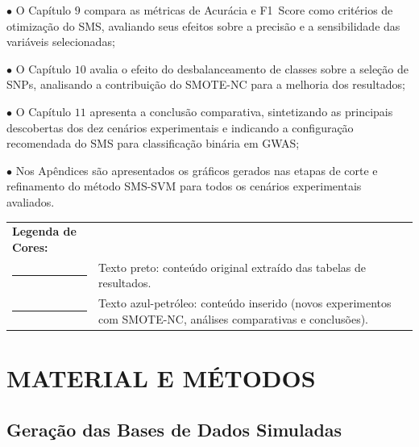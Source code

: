 \documentclass[
    12pt,
    a4paper,
    oneside,
    english,
    french,
    spanish,
    brazil
    ]{abntex2}
\newcommand{\novo}[1]{\textcolor{corNova}{#1}}
\begin{document}
$\bullet$ O Capítulo $9$ compara as métricas de Acurácia e F1~Score como critérios de otimização do SMS, avaliando seus efeitos sobre a precisão e a sensibilidade das variáveis selecionadas;

$\bullet$ O Capítulo $10$ avalia o efeito do desbalanceamento de classes sobre a seleção de SNPs, analisando a contribuição do SMOTE-NC para a melhoria dos resultados;

$\bullet$ O Capítulo $11$ apresenta a conclusão comparativa, sintetizando as principais descobertas dos dez cenários experimentais e indicando a configuração recomendada do SMS para classificação binária em GWAS;

$\bullet$ Nos Apêndices são apresentados os gráficos gerados nas etapas de corte e refinamento do método SMS-SVM para todos os cenários experimentais avaliados.

\begin{center}
\footnotesize
\begin{tabular}{@{}lp{12cm}@{}}
  \textbf{Legenda de Cores:} & \\[2pt]
  \textcolor{black}{\rule{1.2cm}{5pt}} &
    Texto preto: conteúdo original extraído das tabelas de resultados. \\[4pt]
  \textcolor{corNova}{\rule{1.2cm}{5pt}} &
    \novo{Texto azul-petróleo: conteúdo inserido (novos experimentos com
    SMOTE-NC, análises comparativas e conclusões).} \\
\end{tabular}
\end{center}
\vspace{1em}

\chapter{\textbf{MATERIAL E MÉTODOS}}

\section*{Geração das Bases de Dados Simuladas}
\end{document}
